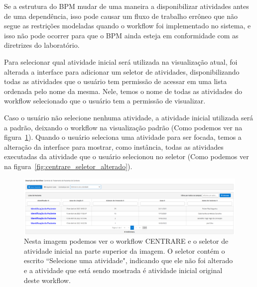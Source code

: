 Se a estrutura do BPM mudar de uma maneira a disponibilizar atividades antes de uma dependência, isso pode causar um fluxo de trabalho errôneo que não segue as restrições modeladas quando o workflow foi implementado no sistema, e isso não pode ocorrer para que o BPM ainda esteja em conformidade com as diretrizes do laboratório.

Para selecionar qual atividade inicial será utilizada na visualização atual, foi alterada a interface para adicionar um seletor de atividades, disponibilizando todas as atividades que o usuário tem permissão de acessar em uma lista ordenada pelo nome da mesma. Nele, temos o nome de todas as atividades do workflow selecionado que o usuário tem a permissão de visualizar.

Caso o usuário não selecione nenhuma atividade, a atividade inicial utilizada será a padrão, deixando o workflow na visualização padrão (Como podemos ver na figura~\ref{fig:centrare_seletor_normal}). Quando o usuário seleciona uma atividade para ser focada, temos a alteração da interface para mostrar, como instância, todas as atividades executadas da atividade que o usuário selecionou no seletor (Como podemos ver na figura~\ref{fig:centrare_seletor_alterado}).

\begin{figure}
    \centering
    \includegraphics[width=1\textwidth]{imgs/CENTRARE/instanciaNormal.png}
    \caption{Nesta imagem podemos ver o workflow CENTRARE e o seletor de atividade inicial na parte superior da imagem. O seletor contém o escrito ``Selecione uma atividade", indicando que ele não foi alterado e a atividade que está sendo mostrada é atividade inicial original deste workflow.}
    \label{fig:centrare_seletor_normal}
\end{figure}

